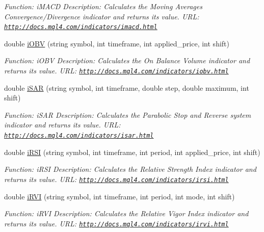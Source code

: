 \begin{DoxyCompactItemize}
\begin{DoxyCompactList}\small\item\em Function\+: i\+M\+A\+CD Description\+: Calculates the Moving Averages Convergence/\+Divergence indicator and returns its value. U\+RL\+: \href{http://docs.mql4.com/indicators/imacd.html}{\tt http\+://docs.\+mql4.\+com/indicators/imacd.\+html} \end{DoxyCompactList}\item 
double \hyperlink{class_m_q_l4_c_sharp_1_1_base_1_1_m_q_l_base_a2690a2127694984f19bc6fe0a7a8fa3b}{i\+O\+BV} (string symbol, int timeframe, int applied\+\_\+price, int shift)
\begin{DoxyCompactList}\small\item\em Function\+: i\+O\+BV Description\+: Calculates the On Balance Volume indicator and returns its value. U\+RL\+: \href{http://docs.mql4.com/indicators/iobv.html}{\tt http\+://docs.\+mql4.\+com/indicators/iobv.\+html} \end{DoxyCompactList}\item 
double \hyperlink{class_m_q_l4_c_sharp_1_1_base_1_1_m_q_l_base_ad8d16bcc9ae016ed146f5956b51c6355}{i\+S\+AR} (string symbol, int timeframe, double step, double maximum, int shift)
\begin{DoxyCompactList}\small\item\em Function\+: i\+S\+AR Description\+: Calculates the Parabolic Stop and Reverse system indicator and returns its value. U\+RL\+: \href{http://docs.mql4.com/indicators/isar.html}{\tt http\+://docs.\+mql4.\+com/indicators/isar.\+html} \end{DoxyCompactList}\item 
double \hyperlink{class_m_q_l4_c_sharp_1_1_base_1_1_m_q_l_base_a6e09150a36d8689e04ffe98a0337dc73}{i\+R\+SI} (string symbol, int timeframe, int period, int applied\+\_\+price, int shift)
\begin{DoxyCompactList}\small\item\em Function\+: i\+R\+SI Description\+: Calculates the Relative Strength Index indicator and returns its value. U\+RL\+: \href{http://docs.mql4.com/indicators/irsi.html}{\tt http\+://docs.\+mql4.\+com/indicators/irsi.\+html} \end{DoxyCompactList}\item 
double \hyperlink{class_m_q_l4_c_sharp_1_1_base_1_1_m_q_l_base_a48679e26468257b47467693efebf8f3c}{i\+R\+VI} (string symbol, int timeframe, int period, int mode, int shift)
\begin{DoxyCompactList}\small\item\em Function\+: i\+R\+VI Description\+: Calculates the Relative Vigor Index indicator and returns its value. U\+RL\+: \href{http://docs.mql4.com/indicators/irvi.html}{\tt http\+://docs.\+mql4.\+com/indicators/irvi.\+html} \end{DoxyCompactList}\item 

\end{DoxyCompactItemize}
